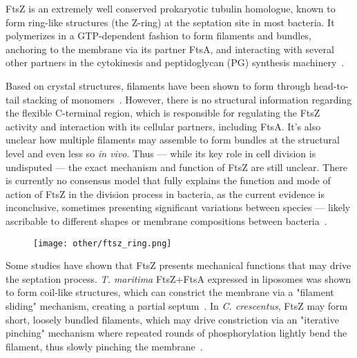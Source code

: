 
FtsZ is an extremely well conserved prokaryotic tubulin homologue, known to form ring-like structures (the Z-ring) at the septation site in most bacteria.
It polymerizes in a GTP-dependent fashion to form filaments and bundles, anchoring to the membrane via its partner FtsA, and interacting with several other partners in the cytokinesis and peptidoglycan (PG) synthesis machinery~\cite{barrowsFtsZDynamicsBacterial2021,mcquillenInsightsStructureFunction2020}.

Based on crystal structures, filaments have been shown to form through head-to-tail stacking of monomers~\cite{olivaStructuralInsightsFtsZ2004,barrowsFtsZDynamicsBacterial2021,mcquillenInsightsStructureFunction2020}.
However, there is no structural information regarding the flexible C-terminal region, which is responsible for regulating the FtsZ activity and interaction with its cellular partners, including FtsA.
It's also unclear how multiple filaments may assemble to form bundles at the structural level and even less so \textit{in vivo}.
Thus --- while its key role in cell division is undisputed --- the exact mechanism and function of FtsZ are still unclear.
There is currently no consensus model that fully explains the function and mode of action of FtsZ in the division process in bacteria, as the current evidence is inconclusive, sometimes presenting significant variations between species --- likely ascribable to different shapes or membrane compositions between bacteria~\cite{barrowsFtsZDynamicsBacterial2021,mcquillenInsightsStructureFunction2020}.

\begin{figure}[ht]
    \centering
    \texttt{[image: other/ftsz\_ring.png]}
    \label{fig:ftsz_ring}
\end{figure}

Some studies have shown that FtsZ presents mechanical functions that may drive the septation process.
\textit{T. maritima} FtsZ+FtsA expressed in liposomes was shown to form coil-like structures, which can constrict the membrane via a "filament sliding" mechanism, creating a partial septum~\cite{szwedziakArchitectureRingFormed2014}.
In \textit{C. crescentus}, FtsZ may form short, loosely bundled filaments, which may drive constriction via an "iterative pinching" mechanism where repeated rounds of phosphorylation lightly bend the filament, thus slowly pinching the membrane~\cite{liStructureFtsZFilaments2007}.

